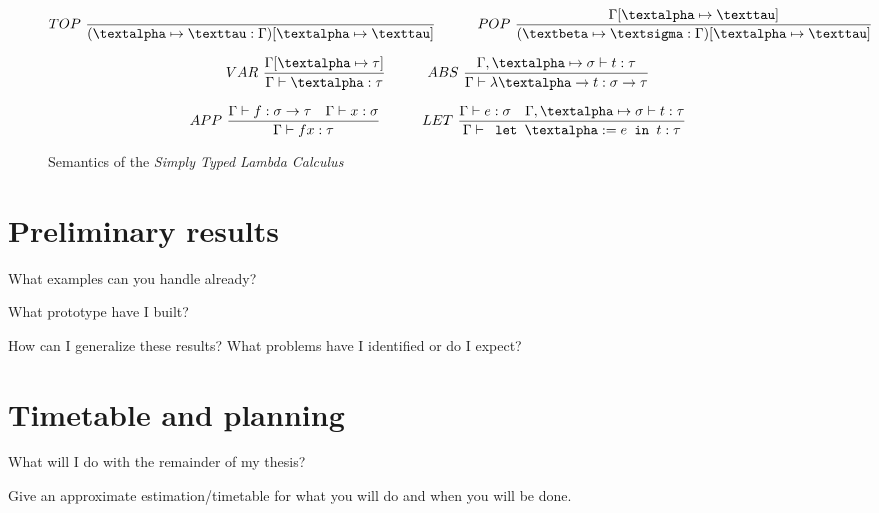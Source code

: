 \documentclass[11pt]{article}
\begin{document}
\begin{figure}[h] 
\hrulefill

\begin{equation*}
  TOP\ \frac{}{(\textalpha \mapsto \texttau : \Gamma) [\textalpha \mapsto \texttau]} 
\quad\quad\quad 
  POP\ \frac{\Gamma[\textalpha \mapsto \texttau]}{(\textbeta \mapsto \textsigma : \Gamma) [ \textalpha \mapsto \texttau ] }
\end{equation*}

\begin{equation*}
  VAR\ \frac{\Gamma[\textalpha \mapsto \tau]}{\Gamma \vdash \textalpha : \tau}
\quad\quad\quad
  ABS\ \frac{\Gamma , \textalpha \mapsto \sigma \vdash t : \tau}{\Gamma \vdash \lambda \textalpha \rightarrow t : \sigma \rightarrow \tau}
\end{equation*}

\begin{equation*}
  APP\ \frac{\Gamma \vdash f : \sigma \rightarrow \tau \quad \Gamma \vdash x : \sigma}{\Gamma \vdash f x : \tau}
\quad\quad\quad 
  LET\ \frac{\Gamma \vdash e : \sigma \quad \Gamma , \textalpha \mapsto \sigma \vdash t : \tau}
            {\Gamma \vdash \texttt{ let } \textalpha := e \texttt{ in } t : \tau }
\end{equation*}

\hrulefill
\caption{Semantics of the \textit{Simply Typed Lambda Calculus}}
\end{figure}


\section{Preliminary results}\label{preliminary}

What examples can you handle already? \cite{lampropoulos2017generating}

What prototype have I built? \cite{duregaard2013feat, claessen2010quickspec}

How can I generalize these results? What problems have I identified or
do I expect? \cite{yakushev2009generic}

\section{Timetable and planning}

What will I do with the remainder of my thesis? \cite{claessen2015generating}

Give an approximate estimation/timetable for what you will do and when you will be done.

\newpage
{}

\end{document}
